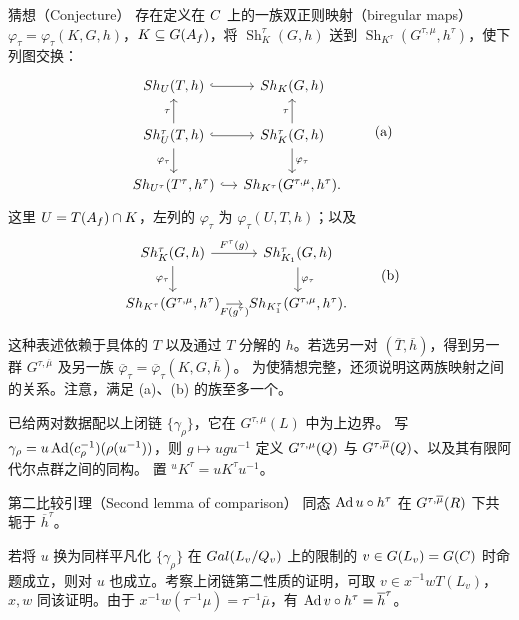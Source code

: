 \begin{originaltheorem}{猜想（Conjecture）}
存在定义在 $C$ 上的一族双正则映射（biregular maps）
$\varphi_\tau=\varphi_\tau(K,G,h)$，$K\subseteq G(A_f)$，将
$\operatorname{Sh}_K^\tau(G,h)$ 送到
$\operatorname{Sh}_{K^\tau}(G^{\tau,\mu},h^\tau)$，使下列图交换：
\[
\begin{tikzcd}[column sep=small]
\operatorname{Sh}_U(T,h)\arrow[r,hook]&\operatorname{Sh}_K(G,h)\\
\operatorname{Sh}_U^\tau(T,h)\arrow[u,"\tau"]\arrow[r,hook]\arrow[d,"\varphi_\tau"']&
\operatorname{Sh}_K^\tau(G,h)\arrow[u,"\tau"]\arrow[d,"\varphi_\tau"]\\
\operatorname{Sh}_{U^\tau}(T^\tau,h^\tau)\arrow[r,hook]&
\operatorname{Sh}_{K^\tau}(G^{\tau,\mu},h^\tau).
\end{tikzcd}\tag{a}
\]
这里 $U=T(A_f)\cap K$，左列的 $\varphi_\tau$ 为 $\varphi_\tau(U,T,h)$；以及
\[
\begin{tikzcd}[column sep=small]
\operatorname{Sh}_K^\tau(G,h)\arrow[r,"\mathfrak F^\tau(g)"]\arrow[d,"\varphi_\tau"']&
\operatorname{Sh}_{K_1}^\tau(G,h)\arrow[d,"\varphi_\tau"]\\
\operatorname{Sh}_{K^\tau}(G^{\tau,\mu},h^\tau)\arrow[r,"\mathfrak F(g^\tau)"']&
\operatorname{Sh}_{K_1^\tau}(G^{\tau,\mu},h^\tau).
\end{tikzcd}\tag{b}
\]
\end{originaltheorem}

这种表述依赖于具体的 $T$ 以及通过 $T$ 分解的 $h$。若选另一对
$(\overline T,\overline h)$，得到另一群 $G^{\tau,\overline\mu}$ 及另一族
$\overline\varphi_\tau=\overline\varphi_\tau(K,G,\overline h)$。
为使猜想完整，还须说明这两族映射之间的关系。注意，满足 (a)、(b) 的族至多一个。

已给两对数据配以上闭链 $\{\gamma_\rho\}$，它在 $G^{\tau,\mu}(L)$ 中为上边界。
写 $\gamma_\rho=u\Ad(c_\rho^{-1})(\rho(u^{-1}))$，则 $g\mapsto ugu^{-1}$ 定义
$G^{\tau,\mu}(Q)$ 与 $G^{\tau,\overline\mu}(Q)$、以及其有限阿代尔点群之间的同构。
置 ${}^uK^\tau=uK^\tau u^{-1}$。

\begin{originaltheorem}{第二比较引理（Second lemma of comparison）}
同态 $\Ad u\circ h^\tau$ 在 $G^{\tau,\overline\mu}(R)$ 下共轭于
$\overline h^\tau$。
\end{originaltheorem}
若将 $u$ 换为同样平凡化 $\{\gamma_\rho\}$ 在 $Gal(L_v/Q_v)$ 上的限制的
$v\in G(L_v)=G(C)$ 时命题成立，则对 $u$ 也成立。考察上闭链第二性质的证明，可取
$v\in x^{-1}wT(L_v)$，$x,w$ 同该证明。由于
$x^{-1}w(\tau^{-1}\mu)=\tau^{-1}\overline\mu$，有
$\Ad v\circ h^\tau=\overline h^\tau$。

